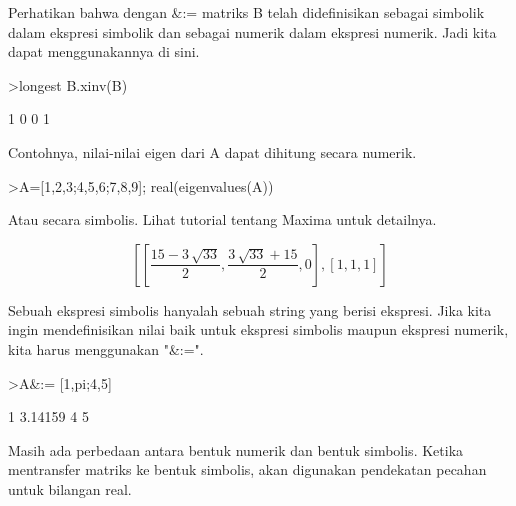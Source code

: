 \documentclass[12pt,arial,letterpaper]{book}
\begin{document}
\begin{eulercomment}
\begin{eulercomment}
\begin{eulercomment}
\begin{eulercomment}
\begin{eulercomment}
\begin{eulercomment}
\begin{eulercomment}
\begin{eulercomment}
\begin{eulercomment}
Perhatikan bahwa dengan \&:= matriks B telah didefinisikan sebagai
simbolik dalam ekspresi simbolik dan sebagai numerik dalam ekspresi
numerik. Jadi kita dapat menggunakannya di sini.
\end{eulercomment}
\begin{eulerprompt}
>longest B.xinv(B)
\end{eulerprompt}
\begin{euleroutput}
                        1                       0 
                        0                       1 
\end{euleroutput}
\begin{eulercomment}
Contohnya, nilai-nilai eigen dari A dapat dihitung secara numerik.
\end{eulercomment}
\begin{eulerprompt}
>A=[1,2,3;4,5,6;7,8,9]; real(eigenvalues(A))
\end{eulerprompt}
\begin{euleroutput}
  [16.1168,  -1.11684,  0]
\end{euleroutput}
\begin{eulercomment}
Atau secara simbolis. Lihat tutorial tentang Maxima untuk detailnya.
\end{eulercomment}
\begin{eulerformula}
\[
\left[ \left[ \frac{15-3\,\sqrt{33}}{2} , \frac{3\,\sqrt{33}+15}{2}
  , 0 \right]  , \left[ 1 , 1 , 1 \right]  \right] 
\]
\end{eulerformula}
\begin{eulercomment}
Sebuah ekspresi simbolis hanyalah sebuah string yang berisi ekspresi.
Jika kita ingin mendefinisikan nilai baik untuk ekspresi simbolis
maupun ekspresi numerik, kita harus menggunakan "\&:=".
\end{eulercomment}
\begin{eulerprompt}
>A&:= [1,pi;4,5]
\end{eulerprompt}
\begin{euleroutput}
              1       3.14159 
              4             5 
\end{euleroutput}
\begin{eulercomment}
Masih ada perbedaan antara bentuk numerik dan bentuk simbolis. Ketika
mentransfer matriks ke bentuk simbolis, akan digunakan pendekatan
pecahan untuk bilangan real.
\end{eulercomment}

\end{eulercomment}
\end{eulercomment}
\end{eulercomment}
\end{eulercomment}
\end{eulercomment}
\end{eulercomment}
\end{eulercomment}
\end{eulercomment}
\end{document}
